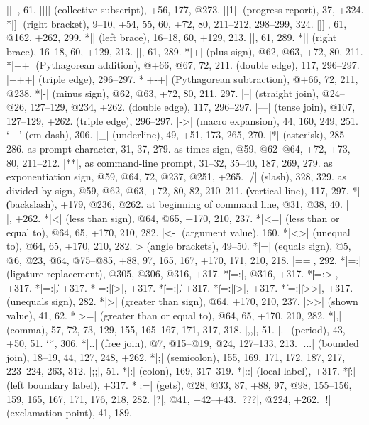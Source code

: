 |[[|, 61.
|[]| (collective subscript), +56, 177, @273.
|[1]| (progress report), 37, +324.
*|]| (right bracket), 9--10, +54, 55, 60, +72, 80, 211--212, 298--299, 324.
|]]|, 61, @162, +262, 299.
*|{| (left brace), 16--18, 60, +129, 213.
|{{|, 61, 289.
*|}| (right brace), 16--18, 60, +129, 213.
|}}|, 61, 289.
*|+| (plus sign), @62, @63, +72, 80, 211.
*|++| (Pythagorean addition), @+66, @67, 72, 211.
\sub (double edge), 117, 296--297.
|+++| (triple edge), 296--297.
*|+-+| (Pythagorean subtraction), @+66, 72, 211, @238.
*|-| (minus sign), @62, @63, +72, 80, 211, 297.
|--| (straight join), @24--@26, 127--129, @234, +262.
\sub (double edge), 117, 296--297.
|---| (tense join), @107, 127--129, +262.
\sub (triple edge), 296--297.
|->| (macro expansion), 44, 160, 249, 251.
`---' (em dash), 306.
|_| (underline), 49, +51, 173, 265, 270.
|*| (asterisk), 285--286.
\sub as prompt character, 31, 37, 279.
\sub {}as times sign, @59, @62--@64, +72, +73, 80, 211--212.
|**|, as command-line prompt, 31--32, 35--40, 187, 269, 279.
\sub as exponentiation sign, @59, @64, 72, @237, @251, +265.
|/| (slash), 328, 329.
\sub {}as divided-by sign, @59, @62, @63, +72, 80, 82, 210--211.
\| (vertical line), 117, 297.
*|\| (backslash), +179, @236, @262.
\sub at beginning of command line, @31, @38, 40.
|\\|, +262.
*|<| (less than sign), @64, @65, +170, 210, 237.
*|<=| (less than or equal to), @64, 65, +170, 210, 282.
|<-| (argument value), 160.
*|<>| (unequal to),  @64, 65, +170, 210, 282.
\<> (angle brackets), 49--50.
*|=| (equals sign), @5, @6, @23, @64, @75--@85, +88, 97, 165, 167, +170,
 171, 210, 218.
|==|, 292.
*|=:| (ligature replacement), @305, @306, @316, +317.
*\||=:|, @316, +317.
*\||=:>|, +317.
*|=:|\|, +317.
*|=:|\||>|, +317.
*\||=:|\|, +317.
*\||=:|\||>|, +317.
*\||=:|\||>>|, +317.
\leavevmode{\tt \rlap/=} (unequals sign), 282.
*|>| (greater than sign), @64, +170, 210, 237.
|>>| (shown value), 41, 62.
*|>=| (greater than or equal to), @64, 65, +170, 210, 282.
*|,| (comma), 57, 72, 73, 129, 155, 165--167, 171, 317, 318.
|,,|\thinspace, 51.
|.|~(period), 43, +50, 51.
`\char`\.', 306.
*|..| (free join), @7, @15--@19, @24, 127--133, 213.
|...| (bounded join), 18--19, 44, 127, 248, +262.
*|;| (semicolon), 155, 169, 171, 172, 187, 217, 223--224, 263, 312.
|;;|\thinspace, 51.
*|:| (colon), 169, 317--319.
*|::| (local label), +317.
*\|\||:| (left boundary label), +317.
*|:=| (gets), @28, @33, 87, +88, 97, @98, 155--156, 159, 165, 167, 171,
 176, 218, 282.
|?|, @41, +42--+43.
|???|, @224, +262.
|!| (exclamation point), 41, 189.
